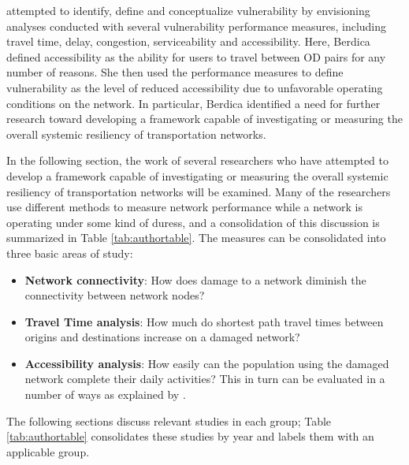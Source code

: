 \citet{berdica2002}
attempted
to identify, define and conceptualize vulnerability by envisioning
analyses conducted with
several vulnerability performance measures, including travel time, delay,
congestion,
serviceability and accessibility. Here, Berdica defined accessibility as
the ability for users to
travel between OD pairs for any number of reasons. She
then used the performance
measures to define vulnerability as the level of reduced accessibility due
to unfavorable
operating conditions on the network. In particular, Berdica identified a
need for further
research toward developing a framework capable of investigating or measuring
the overall systemic resiliency of transportation
networks.

In the following section, the work of several researchers who have attempted to develop
a framework capable of investigating or measuring the overall systemic resiliency
of transportation networks will be examined. Many of the researchers use different
methods to measure network performance while a network is operating under some kind of duress,
and a consolidation of this
discussion is summarized
in Table \ref{tab:authortable}. The measures can be consolidated into three
basic areas of study:

\begin{itemize}
	\item \textbf{Network connectivity}: How does damage to a network
	diminish the connectivity
between network nodes?
	\item \textbf{Travel Time analysis}: How much do shortest path travel
	times between origins
and destinations increase on a damaged network?
	\item \textbf{Accessibility analysis}: How easily can the population
	using the damaged
network complete their daily activities? This in turn can be evaluated in a number of ways as explained by \citet{dong2006}.
\end{itemize}

The following sections discuss relevant studies in each group; Table
\ref{tab:authortable} consolidates these studies by year and labels them
with
an applicable group.

